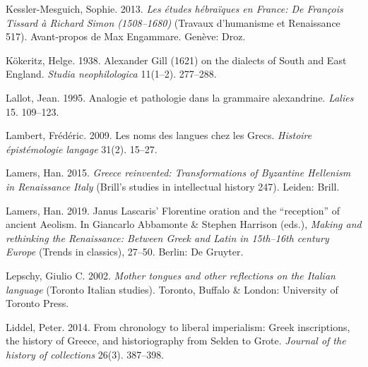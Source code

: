 \begin{styleStandard}
Kessler-Mesguich, Sophie. 2013. \textit{Les études hébraïques en France: De François Tissard à Richard Simon (1508–1680)} (Travaux d’humanisme et Renaissance 517). Avant-propos de Max Engammare. Genève: Droz.
\end{styleStandard}

\begin{styleStandard}
Kökeritz, Helge. 1938. Alexander Gill (1621) on the dialects of South and East England. \textit{Studia neophilologica} 11(1–2). 277–288.
\end{styleStandard}

\begin{styleStandard}
Lallot, Jean. 1995. Analogie et pathologie dans la grammaire alexandrine. \textit{Lalies} 15. 109–123.
\end{styleStandard}

\begin{styleStandard}
Lambert, Frédéric. 2009. Les noms des langues chez les Grecs. \textit{Histoire épistémologie langage} 31(2). 15–27.
\end{styleStandard}

\begin{styleStandard}
Lamers, Han. 2015. \textit{Greece reinvented: Transformations of Byzantine Hellenism in Renaissance Italy} (Brill’s studies in intellectual history 247). Leiden: Brill.
\end{styleStandard}

\begin{styleStandard}
Lamers, Han. 2019. Janus Lascaris’ Florentine oration and the “reception” of ancient Aeolism. In Giancarlo Abbamonte \& Stephen Harrison (eds.), \textit{Making and rethinking the Renaissance: Between Greek and Latin in 15th–16th century Europe} (Trends in classics), 27–50. Berlin: De Gruyter.
\end{styleStandard}

\begin{styleStandard}
Lepschy, Giulio C. 2002. \textit{Mother tongues and other reflections on the Italian language} (Toronto Italian studies). Toronto, Buffalo \& London: University of Toronto Press.
\end{styleStandard}

\begin{styleStandard}
Liddel, Peter. 2014. From chronology to liberal imperialism: Greek inscriptions, the history of Greece, and historiography from Selden to Grote. \textit{Journal of the history of collections} 26(3). 387–398.
\end{styleStandard}

